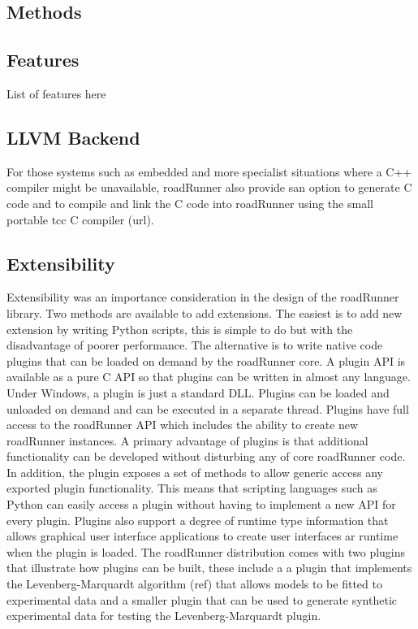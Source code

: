 \documentclass{bioinfo}
\begin{document}
\begin{methods}
\section{Methods}

\subsection{Features}

List of features here

\subsection{LLVM Backend}

For those systems such as embedded and more specialist situations where a C++ compiler might be unavailable, roadRunner also provide san option to generate C code and to compile and link the C code into roadRunner using the small portable tcc C compiler (url).


\subsection{Extensibility}

Extensibility was an importance consideration in the design of the roadRunner library. Two methods are available to add extensions. The easiest is to add new extension by writing Python scripts, this is simple to do but with the disadvantage of poorer performance. The alternative is to write native code plugins that can be loaded on demand by the roadRunner core. A plugin API is available as a pure C API so that plugins can be written in almost any language. Under Windows, a plugin is just a standard DLL. Plugins can be loaded and unloaded on demand and can be executed in a separate thread. Plugins have full access to the roadRunner API which includes the ability to create new roadRunner instances. A primary advantage of plugins is that additional functionality can be developed without disturbing any of core roadRunner code. In addition, the plugin exposes a set of methods to allow generic access any exported plugin functionality. This means that scripting languages such as Python can easily access a plugin without having to implement a new API for every plugin. Plugins also support a degree of runtime type information that allows graphical user interface applications to create user interfaces ar runtime when the plugin is loaded. The roadRunner distribution comes with two plugins that illustrate how plugins can be built, these include a a plugin that implements the Levenberg-Marquardt algorithm (ref) that allows models to be fitted to experimental data and a smaller plugin that can be used to generate synthetic experimental data for testing the Levenberg-Marquardt plugin.


\end{methods}
\end{document}
